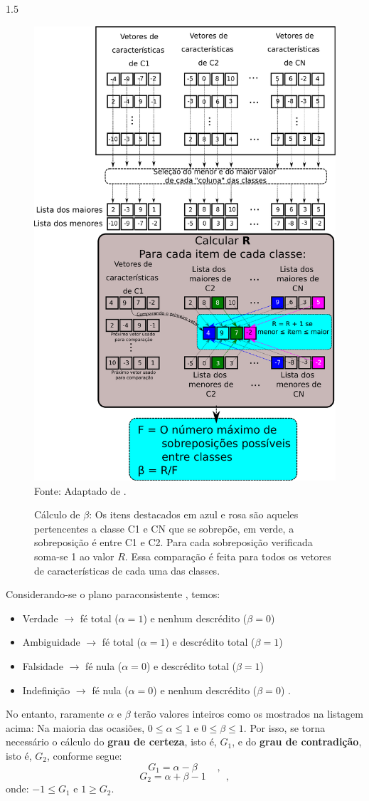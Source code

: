 \documentclass[a4paper,12pt,openright,oneside]{book}
\newenvironment{myenv}[1]
  {\begin{spacing}{#1}}
  {\end{spacing}}
\begin{document}
\begin{myenv}{1.5}
					\begin{figure}[h]
						\centering
						\caption{Cálculo de $\beta$: Os itens destacados em azul e rosa são aqueles pertencentes a classe C1 e CN que se sobrepõe, em verde, a sobreposição é entre C1 e C2. Para cada sobreposição verificada soma-se 1 ao valor $R$. Essa comparação é feita para todos os vetores de características de cada uma das classes.}
						\includegraphics[width=0.5\linewidth]{images/betaCalculation.pdf}
						\label{fig:betacalculation}
						\\Fonte: Adaptado de \cite{8588433}.
					\end{figure}
					
					\par Considerando-se o plano paraconsistente \cite{8588433}, temos: 
					
					\begin{itemize}
						\item Verdade $\rightarrow$ fé total ($\alpha = 1$) e nenhum descrédito ($\beta = 0$)
						\item Ambiguidade $\rightarrow$ fé total ($\alpha = 1$) e descrédito total ($\beta = 1$)
						\item Falsidade $\rightarrow$ fé nula ($\alpha = 0$) e descrédito total ($\beta = 1$)
						\item Indefinição $\rightarrow$ fé nula ($\alpha = 0$) e nenhum descrédito ($\beta = 0$) \qquad.
					\end{itemize}
					
					\par No entanto, raramente $\alpha$ e $\beta$ terão valores inteiros como os mostrados na listagem acima: Na maioria das ocasiões, $0 \leqslant \alpha \leqslant 1$ e $0 \leqslant \beta \leqslant 1$. Por isso, se torna necessário o cálculo do \textbf{grau de certeza}, isto é, $G_1$, e do \textbf{grau de contradição}, isto é, $G_2$, conforme segue:
					\begin{equation}
						G_1=\alpha-\beta  \qquad,
					\end{equation}
					\begin{equation}
						G_2=\alpha+\beta-1 \qquad,
					\end{equation}
					onde: $-1 \leqslant G_1$ e  $1 \geqslant G_2$.
					

\end{myenv}
\end{document}
